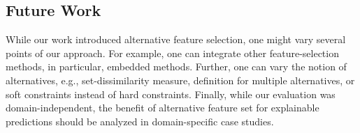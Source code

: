 \documentclass[conference]{IEEEtran}
\theoremstyle{definition}
\begin{document}
\subsection{Future Work}

While our work introduced alternative feature selection, one might vary several points of our approach.
For example, one can integrate other feature-selection methods, in particular, embedded methods.
Further, one can vary the notion of alternatives, e.g., set-dissimilarity measure, definition for multiple alternatives, or soft constraints instead of hard constraints.
Finally, while our evaluation was domain-independent, the benefit of alternative feature set for explainable predictions should be analyzed in domain-specific case studies.



\end{document}
